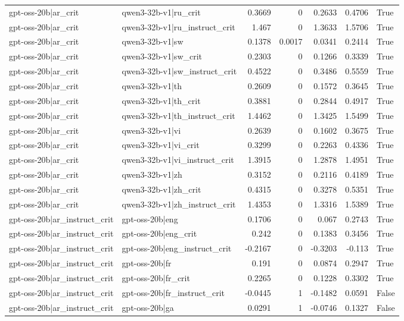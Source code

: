 \begin{table}
\begin{tabular}{l l r r r r l}
gpt-oss-20b|ar_crit & qwen3-32b-v1|ru_crit & 0.3669 & 0 & 0.2633 & 0.4706 & True \\
gpt-oss-20b|ar_crit & qwen3-32b-v1|ru_instruct_crit & 1.467 & 0 & 1.3633 & 1.5706 & True \\
gpt-oss-20b|ar_crit & qwen3-32b-v1|sw & 0.1378 & 0.0017 & 0.0341 & 0.2414 & True \\
gpt-oss-20b|ar_crit & qwen3-32b-v1|sw_crit & 0.2303 & 0 & 0.1266 & 0.3339 & True \\
gpt-oss-20b|ar_crit & qwen3-32b-v1|sw_instruct_crit & 0.4522 & 0 & 0.3486 & 0.5559 & True \\
gpt-oss-20b|ar_crit & qwen3-32b-v1|th & 0.2609 & 0 & 0.1572 & 0.3645 & True \\
gpt-oss-20b|ar_crit & qwen3-32b-v1|th_crit & 0.3881 & 0 & 0.2844 & 0.4917 & True \\
gpt-oss-20b|ar_crit & qwen3-32b-v1|th_instruct_crit & 1.4462 & 0 & 1.3425 & 1.5499 & True \\
gpt-oss-20b|ar_crit & qwen3-32b-v1|vi & 0.2639 & 0 & 0.1602 & 0.3675 & True \\
gpt-oss-20b|ar_crit & qwen3-32b-v1|vi_crit & 0.3299 & 0 & 0.2263 & 0.4336 & True \\
gpt-oss-20b|ar_crit & qwen3-32b-v1|vi_instruct_crit & 1.3915 & 0 & 1.2878 & 1.4951 & True \\
gpt-oss-20b|ar_crit & qwen3-32b-v1|zh & 0.3152 & 0 & 0.2116 & 0.4189 & True \\
gpt-oss-20b|ar_crit & qwen3-32b-v1|zh_crit & 0.4315 & 0 & 0.3278 & 0.5351 & True \\
gpt-oss-20b|ar_crit & qwen3-32b-v1|zh_instruct_crit & 1.4353 & 0 & 1.3316 & 1.5389 & True \\
gpt-oss-20b|ar_instruct_crit & gpt-oss-20b|eng & 0.1706 & 0 & 0.067 & 0.2743 & True \\
gpt-oss-20b|ar_instruct_crit & gpt-oss-20b|eng_crit & 0.242 & 0 & 0.1383 & 0.3456 & True \\
gpt-oss-20b|ar_instruct_crit & gpt-oss-20b|eng_instruct_crit & -0.2167 & 0 & -0.3203 & -0.113 & True \\
gpt-oss-20b|ar_instruct_crit & gpt-oss-20b|fr & 0.191 & 0 & 0.0874 & 0.2947 & True \\
gpt-oss-20b|ar_instruct_crit & gpt-oss-20b|fr_crit & 0.2265 & 0 & 0.1228 & 0.3302 & True \\
gpt-oss-20b|ar_instruct_crit & gpt-oss-20b|fr_instruct_crit & -0.0445 & 1 & -0.1482 & 0.0591 & False \\
gpt-oss-20b|ar_instruct_crit & gpt-oss-20b|ga & 0.0291 & 1 & -0.0746 & 0.1327 & False \\

\end{tabular}
\end{table}

